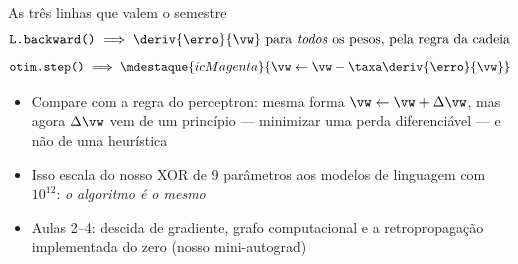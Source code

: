 \documentclass[aspectratio=169, 11pt]{beamer}
\begin{document}
\begin{frame}{As três linhas que valem o semestre}
  \[
    \texttt{L.backward()}
    \;\Longrightarrow\;
    \deriv{\erro}{\vw} \text{ para \emph{todos} os pesos, pela regra da cadeia}
  \]
  \[
    \texttt{otim.step()}
    \;\Longrightarrow\;
    \mdestaque{icMagenta}{\vw \leftarrow \vw - \taxa \deriv{\erro}{\vw}}
  \]

  \begin{itemize}\setlength{\itemsep}{0.35ex}
    \item Compare com a regra do perceptron: mesma forma
          \(\vw \leftarrow \vw + \Delta\vw\), mas agora \(\Delta\vw\) vem de um
          \alert{princípio} — minimizar uma perda diferenciável — e não de uma
          heurística
    \item Isso escala do nosso XOR de 9 parâmetros aos modelos de linguagem com
          $10^{12}$: \emph{o algoritmo é o mesmo}
    \item Aulas 2--4: descida de gradiente, grafo computacional e a
          retropropagação implementada do zero (nosso mini-autograd)
  \end{itemize}
\end{frame}
\end{document}
